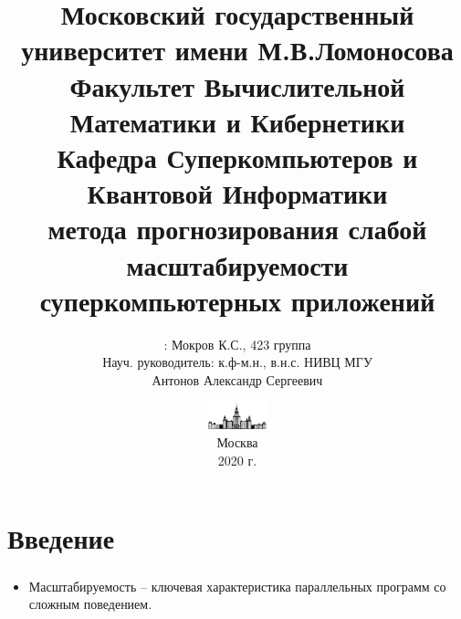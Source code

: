 \documentclass[unicode, t, 11pt]{beamer}%
\title{
	{\footnotesize\color{black}Московский государственный университет имени М.В.Ломоносова\\
    Факультет Вычислительной Математики и Кибернетики\\
    Кафедра Суперкомпьютеров и Квантовой Информатики\\}
    \vspace{\baselineskip}
    {\LARGEРазработка метода прогнозирования слабой масштабируемости суперкомпьютерных приложений}
}
\author{\footnotesizeСтудент: Мокров К.С., 423 группа\\
		Науч. руководитель: к.ф-м.н.,
		в.н.с. НИВЦ МГУ\\
		Антонов Александр Сергеевич}
\date{\includegraphics[height=0.8cm]{./images/MSU}\\
	  \scriptsize
	  Москва\\
	  2020 г.}
\begin{document}
	\frame[plain]{\titlepage}  %
	
	\section{Введение}
		\begin{frame}
		\frametitle{\insertsection}
		\begin{itemize}[label = \(\bullet\)]


		\item Масштабируемость – ключевая характеристика параллельных программ со сложным поведением.



\end{itemize}
\end{frame}
\end{document}

